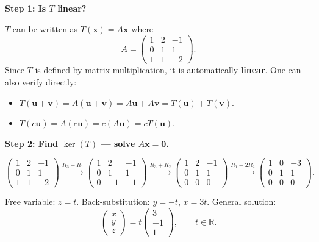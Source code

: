 \documentclass[12pt,a3paper]{article}
\begin{document}
\begin{tcolorbox}[enhanced,breakable,
  colback=cF!4,colframe=cF,boxrule=0.8pt,arc=5pt,
  title={\textbf{Answer --- $T(x,y,z)=(x+2y-z,\;y+z,\;x+y-2z)$: Linearity, $\ker T$, $\mathrm{Im}\,T$}},
  fonttitle=\bfseries\color{white},colbacktitle=cF]

\textbf{Step 1: Is $T$ linear?}

$T$ can be written as $T(\mathbf{x})=A\mathbf{x}$ where
\[
A=\begin{pmatrix}1&2&-1\\0&1&1\\1&1&-2\end{pmatrix}.
\]
Since $T$ is defined by matrix multiplication, it is automatically \textbf{linear}. One can also verify directly:
\begin{itemize}[itemsep=2pt]
  \item $T(\mathbf{u}+\mathbf{v})=A(\mathbf{u}+\mathbf{v})=A\mathbf{u}+A\mathbf{v}=T(\mathbf{u})+T(\mathbf{v})$. \checkmark
  \item $T(c\mathbf{u})=A(c\mathbf{u})=c(A\mathbf{u})=cT(\mathbf{u})$. \checkmark
\end{itemize}

\textbf{Step 2: Find $\ker(T)$ — solve $A\mathbf{x}=\mathbf{0}$.}

\[
\begin{pmatrix}1&2&-1\\0&1&1\\1&1&-2\end{pmatrix}
\xrightarrow{R_3-R_1}
\begin{pmatrix}1&2&-1\\0&1&1\\0&-1&-1\end{pmatrix}
\xrightarrow{R_3+R_2}
\begin{pmatrix}1&2&-1\\0&1&1\\0&0&0\end{pmatrix}
\xrightarrow{R_1-2R_2}
\begin{pmatrix}1&0&-3\\0&1&1\\0&0&0\end{pmatrix}.
\]

Free variable: $z=t$. Back-substitution: $y=-t$, $x=3t$. General solution:
\[
\begin{pmatrix}x\\y\\z\end{pmatrix}=t\begin{pmatrix}3\\-1\\1\end{pmatrix},\qquad t\in\mathbb{R}.
\]


\end{tcolorbox}
\end{document}
